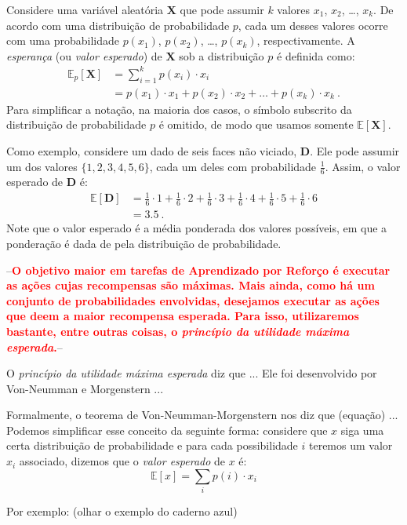\documentclass{article}
\newcommand*{\RandomVariable}[1]{\mathbf{#1}}
\newcommand*{\ExpectedValue}{\mathbb{E}}
\newcommand{\todo}[1]{ --\textcolor{red}{\textbf{#1}}--}
\begin{document}
        Considere uma variável aleatória $\RandomVariable{X}$ que pode assumir $k$ valores $x_1$, $x_2$, \dots, $x_k$. De acordo com uma distribuição de probabilidade $p$, cada um desses valores ocorre com uma probabilidade $p(x_1)$, $p(x_2)$, \dots, $p(x_k)$, respectivamente. A \emph{esperança} (ou \emph{valor esperado}) de $\RandomVariable{X}$ sob a distribuição $p$ é definida como:
        \begin{equation}
        \begin{aligned}
            \label{eq:state-value}
            \ExpectedValue_p[\RandomVariable{X}] & = \sum_{i=1}^k p(x_i) \cdot x_i \\
            & = p(x_1) \cdot x_1 + p(x_2) \cdot x_2 + \dots + p(x_k) \cdot x_k\ .
        \end{aligned}
        \end{equation}
        Para simplificar a notação, na maioria dos casos, o símbolo subscrito da distribuição de probabilidade $p$ é omitido, de modo que usamos somente $\ExpectedValue[\RandomVariable{X}]$.

        Como exemplo, considere um dado de seis faces não viciado, $\RandomVariable{D}$. Ele pode assumir um dos valores $\{1, 2, 3, 4, 5, 6\}$, cada um deles com probabilidade $\frac{1}{6}$. Assim, o valor esperado de $\RandomVariable{D}$ é:
        \begin{equation*}
        \begin{aligned}
            \ExpectedValue[\RandomVariable{D}] & = \frac{1}{6} \cdot 1 + \frac{1}{6} \cdot 2 + \frac{1}{6} \cdot 3 + \frac{1}{6} \cdot 4 + \frac{1}{6} \cdot 5 + \frac{1}{6} \cdot 6 \\
            & = 3.5\ .
        \end{aligned}
        \end{equation*}        
        Note que o valor esperado é a média ponderada dos valores possíveis, em que a ponderação é dada de pela distribuição de probabilidade.
    
        \todo{O objetivo maior em tarefas de Aprendizado por Reforço é executar as ações cujas recompensas são máximas. Mais ainda, como há um conjunto de probabilidades envolvidas, desejamos executar as ações que deem a maior recompensa esperada. Para isso, utilizaremos bastante, entre outras coisas, o \emph{princípio da utilidade máxima esperada}.}

        O \emph{princípio da utilidade máxima esperada} diz que ... Ele foi desenvolvido por Von-Neumman e Morgenstern ...
        
        Formalmente, o teorema de Von-Neumman-Morgenstern nos diz que (equação) ... Podemos simplificar esse conceito da seguinte forma: considere que $x$ siga uma certa distribuição de probabilidade e para cada possibilidade $i$ teremos um valor $x_i$ associado, dizemos que o \emph{valor esperado} de $x$ é:
        \begin{equation}
            \mathbb{E} \left [ x \right ] = \sum_{i} p(i) \cdot x_i
        \end{equation}
        
        Por exemplo: (olhar o exemplo do caderno azul)
    
    \printbibliography
    
\end{document}

